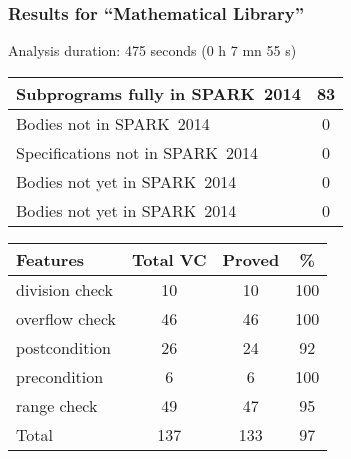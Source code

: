 \documentclass[10pt,a4paper,twocolumn]{article}
\newcommand{\newspark}{SPARK~2014\xspace}
\begin{document}
\subsubsection{Results for ``Mathematical Library''}

Analysis duration: 475 seconds (0 h 7 mn 55 s)

\vspace{5mm}

\begin{tabular}{|l|c|}
\hline
Subprograms fully in \newspark  & 83 \\
\hline
Bodies not in \newspark         & 0  \\
\hline
Specifications not in \newspark & 0  \\
\hline
Bodies not yet in \newspark     & 0  \\
\hline
Bodies not yet in \newspark     & 0  \\
\hline
\end{tabular}

\vspace{5mm}

\begin{tabular}{|l|c|c|c|}
\hline
Features       & Total VC & Proved & \%  \\ %
\hline
division check & 10       & 10     & 100 \\ %
\hline
overflow check & 46       & 46     & 100 \\ %
\hline
postcondition  & 26       & 24     & 92  \\ %
\hline
precondition   & 6        & 6      & 100 \\ %
\hline
range check    & 49       & 47     & 95  \\ %
\hline
Total          & 137      & 133    & 97  \\ %
\hline
\end{tabular}

\end{document}
